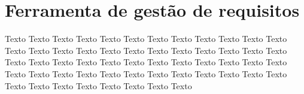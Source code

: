 \chapter{Ferramenta de gestão de requisitos}

  Texto Texto Texto Texto Texto Texto Texto Texto Texto Texto Texto Texto Texto Texto
  Texto Texto Texto Texto Texto Texto Texto Texto Texto Texto Texto Texto Texto Texto
  Texto Texto Texto Texto Texto Texto Texto Texto Texto Texto Texto Texto Texto Texto
  Texto Texto Texto Texto Texto Texto Texto Texto Texto Texto Texto Texto Texto Texto

